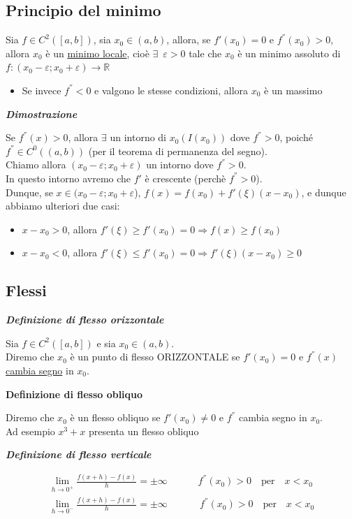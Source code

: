 \documentclass{article}
\theoremstyle{definition}
\newcommand{\R}{\mathbb{R}}
\begin{document}
\subsection{Principio del minimo}
Sia $f \in C^2([a,b])$, sia $x_0 \in (a,b)$, allora, se $f'(x_0)=0$ e $f^{''}(x_0)>0$, allora $x_0$ è un \underline{minimo locale}, cioè $\exists \,\,\, \varepsilon >0$ tale che $x_0$ è un minimo assoluto di $f: (x_0- \varepsilon; x_0+\varepsilon) \to \R$
\\
\begin{itemize}
\item Se invece $f^{''}<0$ e valgono le stesse condizioni, allora $x_0$ è un massimo
\end{itemize}
\begin{center}
    \textbf{\textit{Dimostrazione}}
\end{center}
Se $f^{''}(x)>0$, allora $\exists$ un intorno di $x_0 (I(x_0))$ dove $f^{''}>0$, poiché $f^{''} \in C^0((a,b))$ (per il teorema di permanenza del segno).
\\
Chiamo allora $(x_0-\varepsilon; x_0+ \varepsilon)$ un intorno dove $f^{''}>0$.
\\
In questo intorno avremo che $f'$ è crescente (perchè $f^{''}>0$).
\\
Dunque, se $x \in (x_0-\varepsilon; x_0+\varepsilon$), $f(x)=f(x_0)+f'(\xi)(x-x_0)$, e dunque abbiamo ulteriori due casi:
\begin{itemize}
    \item $x-x_0 >0$, allora $f'(\xi) \geqslant f'(x_0) =0 \Longrightarrow f(x) \geqslant f(x_0)$
    \item $x-x_0<0$, allora $f'(\xi) \leqslant f'(x_0)=0 \Longrightarrow f'(\xi)(x-x_0) \geqslant 0$
\end{itemize}
\subsection{Flessi}
\begin{center}
    \textbf{\textit{Definizione di flesso orizzontale}}
\end{center}
Sia $f \in C^2([a,b])$ e sia $x_0 \in (a,b)$.
\\
Diremo che $x_0$ è un punto di flesso ORIZZONTALE se $f'(x_0)=0$ e $f^{''}(x)$ \underline{cambia segno} in $x_0$.
\begin{center}
    \textbf{Definizione di flesso obliquo}
\end{center}
Diremo che $x_0$ è un flesso obliquo se $f'(x_0) \neq 0$ e $f^{''}$ cambia segno in $x_0$.
\\
Ad esempio $x^3+x$ presenta un flesso obliquo
\begin{center}
    \textbf{\textit{Definizione di flesso verticale}}
\end{center}
\begin{align*}
    \lim_{h \to 0^+}\frac{f(x+h)-f(x)}{h}= \pm \infty  & \,\,\,\,\,\,\,\,\,\,\,\,\,\,  f^{''}(x_0) > 0 \,\,\,\,\,\,\mbox{per} \,\,\,\,\,\, x < x_0 \\
    \lim_{h \to 0^-} \frac{f(x+h)-f(x)}{h} = \pm \infty  &   \,\,\,\,\,\,\,\,\,\,\,\,\,\,\,    f^{''}(x_0) > 0 \,\,\,\,\,\, \mbox{per} \,\,\,\,\,\, x<x_0  
\end{align*}
\end{document}
